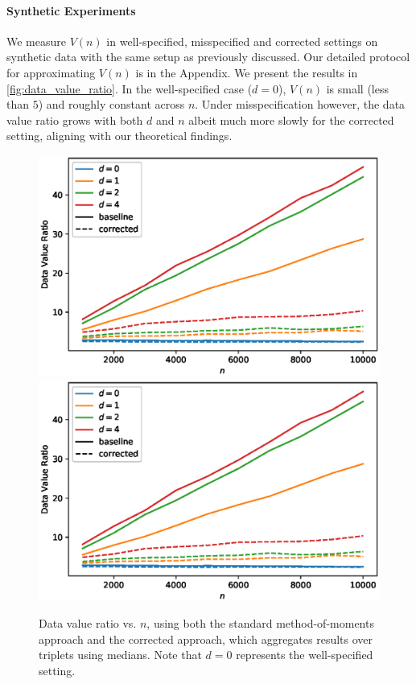 \vspace{-0.5em}
\paragraph{Synthetic Experiments} We measure $V(n)$ in well-specified, misspecified and corrected settings on synthetic data with the same setup as previously discussed. Our detailed protocol for approximating $V(n)$ is in the Appendix. 
We present the results in \autoref{fig:data_value_ratio}. In the well-specified case ($d = 0$), $V(n)$ is small (less than $5$) and roughly constant across $n$. Under misspecification however, the data value ratio grows with both $d$ and $n$ albeit much more slowly for the corrected setting, aligning with our theoretical findings.

\begin{figure}
    \centering
    \ifsinglecolumn
    \includegraphics[width=.5\textwidth]{eps_figures/data_value_ratio_vs_n.eps}
    \else
    \includegraphics[width=.3\textwidth]{eps_figures/data_value_ratio_vs_n.eps}
    \fi
    \caption{Data value ratio vs. $n$, using both the standard method-of-moments approach and the corrected approach, which aggregates results over triplets using medians. Note that $d=0$ represents the well-specified setting. %
    }
    \label{fig:data_value_ratio}
\end{figure}

